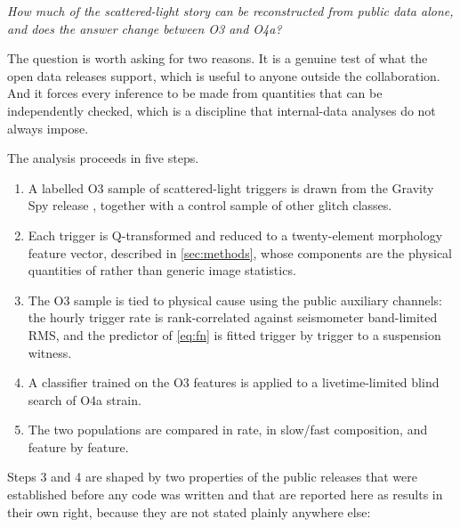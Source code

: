 \emph{How much of the scattered-light story can be reconstructed from public
data alone, and does the answer change between O3 and O4a?}

The question is worth asking for two reasons. It is a genuine test of what the
open data releases support, which is useful to anyone outside the
collaboration. And it forces every inference to be made from quantities that
can be independently checked, which is a discipline that internal-data
analyses do not always impose.

The analysis proceeds in five steps.

\begin{enumerate}
  \item A labelled O3 sample of scattered-light triggers is drawn from the
        Gravity Spy release \citep{GravitySpyData2021}, together with a
        control sample of other glitch classes.
  \item Each trigger is Q-transformed \citep{Chatterji2004} and reduced to a
        twenty-element morphology feature vector, described in
        \cref{sec:methods}, whose components are the physical quantities of
         rather than generic image statistics.
  \item The O3 sample is tied to physical cause using the public auxiliary
        channels: the hourly trigger rate is rank-correlated against
        seismometer band-limited RMS, and the predictor of \cref{eq:fn} is
        fitted trigger by trigger to a suspension witness.
  \item A classifier trained on the O3 features is applied to a
        livetime-limited blind search of O4a strain.
  \item The two populations are compared in rate, in slow/fast composition,
        and feature by feature.
\end{enumerate}

Steps 3 and 4 are shaped by two properties of the public releases that were
established before any code was written and that are reported here as results
in their own right, because they are not stated plainly anywhere else:

